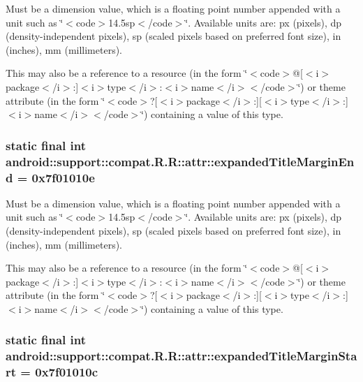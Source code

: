 Must be a dimension value, which is a floating point number appended with a unit such as \char`\"{}$<$code$>$14.5sp$<$/code$>$\char`\"{}. Available units are: px (pixels), dp (density-independent pixels), sp (scaled pixels based on preferred font size), in (inches), mm (millimeters). 

This may also be a reference to a resource (in the form \char`\"{}$<$code$>$@\mbox{[}$<$i$>$package$<$/i$>$:\mbox{]}$<$i$>$type$<$/i$>$:$<$i$>$name$<$/i$>$$<$/code$>$\char`\"{}) or theme attribute (in the form \char`\"{}$<$code$>$?\mbox{[}$<$i$>$package$<$/i$>$:\mbox{]}\mbox{[}$<$i$>$type$<$/i$>$:\mbox{]}$<$i$>$name$<$/i$>$$<$/code$>$\char`\"{}) containing a value of this type. \hypertarget{classandroid_1_1support_1_1compat_1_1_r_1_1attr_59713d8dab4064971a666768f7809603}{
\subsubsection[{expandedTitleMarginEnd}]{\setlength{\rightskip}{0pt plus 5cm}static final int android::support::compat.R.R::attr::expandedTitleMarginEnd = 0x7f01010e}}
\label{classandroid_1_1support_1_1compat_1_1_r_1_1attr_59713d8dab4064971a666768f7809603}


Must be a dimension value, which is a floating point number appended with a unit such as \char`\"{}$<$code$>$14.5sp$<$/code$>$\char`\"{}. Available units are: px (pixels), dp (density-independent pixels), sp (scaled pixels based on preferred font size), in (inches), mm (millimeters). 

This may also be a reference to a resource (in the form \char`\"{}$<$code$>$@\mbox{[}$<$i$>$package$<$/i$>$:\mbox{]}$<$i$>$type$<$/i$>$:$<$i$>$name$<$/i$>$$<$/code$>$\char`\"{}) or theme attribute (in the form \char`\"{}$<$code$>$?\mbox{[}$<$i$>$package$<$/i$>$:\mbox{]}\mbox{[}$<$i$>$type$<$/i$>$:\mbox{]}$<$i$>$name$<$/i$>$$<$/code$>$\char`\"{}) containing a value of this type. \hypertarget{classandroid_1_1support_1_1compat_1_1_r_1_1attr_92df8de57f7d36d9c5682ae7b515e76e}{
\subsubsection[{expandedTitleMarginStart}]{\setlength{\rightskip}{0pt plus 5cm}static final int android::support::compat.R.R::attr::expandedTitleMarginStart = 0x7f01010c}}
\label{classandroid_1_1support_1_1compat_1_1_r_1_1attr_92df8de57f7d36d9c5682ae7b515e76e}


